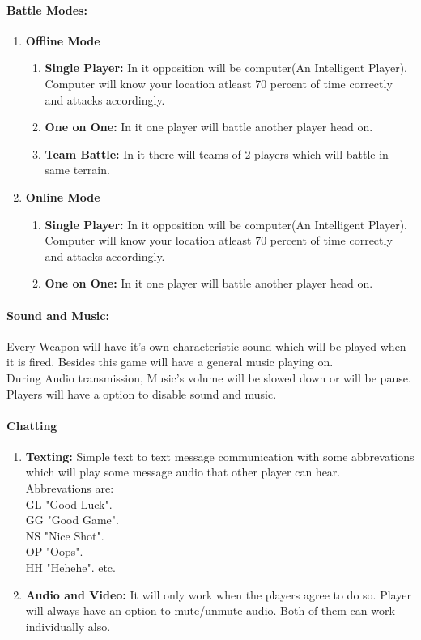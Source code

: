 \documentclass[12pt]{extarticle}
\begin{document}
\paragraph{Battle Modes:}
\begin{enumerate}
\item \textbf{Offline Mode}
\begin{enumerate}
\item \textbf{Single Player:} In it opposition will be computer(An Intelligent Player). Computer will know your location atleast 70 percent of time correctly and attacks accordingly.
\item \textbf{One on One:} In it one player will battle another player head on.
\item \textbf{Team Battle:} In it there will teams of 2 players which will battle in same terrain.
\end{enumerate}
\item \textbf{Online Mode}
\begin{enumerate}
\item \textbf{Single Player:} In it opposition will be computer(An Intelligent Player). Computer will know your location atleast 70 percent of time correctly and attacks accordingly.
\item \textbf{One on One: }In it one player will battle another player head on.
\end{enumerate}
\end{enumerate}

\paragraph{Sound and Music:}

		Every Weapon will have it's own characteristic sound which will be played when it is fired. Besides this game will have a general music playing on.\\
			During Audio transmission, Music's volume will be slowed down or will be pause.
		\\Players will have a option to disable sound and music.


\paragraph{Chatting}
\begin{enumerate}
\item \textbf{Texting:}
Simple text to text message communication with some abbrevations which will play some message audio that other player can hear.\\
		Abbrevations are:\\
			GL "Good Luck".\\
			GG "Good Game".\\
			NS "Nice Shot".\\
			OP "Oops".\\
			HH "Hehehe".
			etc.\\
\item \textbf{Audio and Video:}
It will only work when the players agree to do so. Player will always have an option to mute/unmute audio. Both of them can work individually also.
\end{enumerate}
\end{document}
